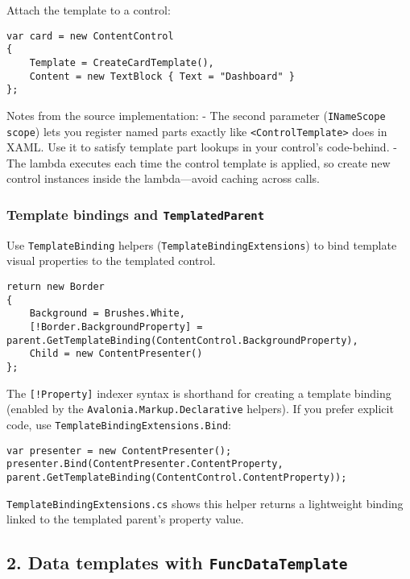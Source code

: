 Attach the template to a control:

\begin{lstlisting}
var card = new ContentControl
{
    Template = CreateCardTemplate(),
    Content = new TextBlock { Text = "Dashboard" }
};
\end{lstlisting}

Notes from the source implementation: - The second parameter
(\passthrough{\lstinline!INameScope scope!}) lets you register named
parts exactly like \passthrough{\lstinline!<ControlTemplate>!} does in
XAML. Use it to satisfy template part lookups in your control's
code-behind. - The lambda executes each time the control template is
applied, so create new control instances inside the lambda---avoid
caching across calls.

\subsubsection{\texorpdfstring{Template bindings and
\texttt{TemplatedParent}}{Template bindings and TemplatedParent}}\label{template-bindings-and-templatedparent}

Use \passthrough{\lstinline!TemplateBinding!} helpers
(\passthrough{\lstinline!TemplateBindingExtensions!}) to bind template
visual properties to the templated control.

\begin{lstlisting}
return new Border
{
    Background = Brushes.White,
    [!Border.BackgroundProperty] = parent.GetTemplateBinding(ContentControl.BackgroundProperty),
    Child = new ContentPresenter()
};
\end{lstlisting}

The \passthrough{\lstinline"[!Property]"} indexer syntax is shorthand
for creating a template binding (enabled by the
\passthrough{\lstinline!Avalonia.Markup.Declarative!} helpers). If you
prefer explicit code, use
\passthrough{\lstinline!TemplateBindingExtensions.Bind!}:

\begin{lstlisting}
var presenter = new ContentPresenter();
presenter.Bind(ContentPresenter.ContentProperty, parent.GetTemplateBinding(ContentControl.ContentProperty));
\end{lstlisting}

\passthrough{\lstinline!TemplateBindingExtensions.cs!} shows this helper
returns a lightweight binding linked to the templated parent's property
value.

\subsection{\texorpdfstring{2. Data templates with
\texttt{FuncDataTemplate}}{2. Data templates with FuncDataTemplate}}\label{data-templates-with-funcdatatemplate}

